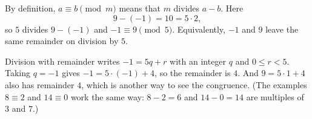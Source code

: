 By definition, $a\equiv b\pmod m$ means that $m$ divides $a-b$. Here
\[
9-(-1)=10=5\cdot2,
\]
so $5$ divides $9-(-1)$ and $-1\equiv9\pmod5$. Equivalently, $-1$ and $9$ leave the same remainder on division by $5$.

Division with remainder writes $-1=5q+r$ with an integer $q$ and $0\le r<5$. Taking $q=-1$ gives $-1=5\cdot(-1)+4$, so the remainder is $\boxed{4}$. And $9=5\cdot1+4$ also has remainder $4$, which is another way to see the congruence. (The examples $8\equiv2$ and $14\equiv0$ work the same way: $8-2=6$ and $14-0=14$ are multiples of $3$ and $7$.)
